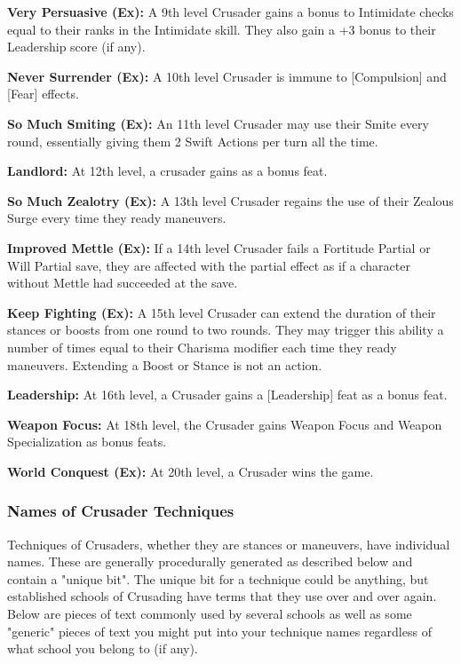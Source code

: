\textbf{Very Persuasive (Ex):} A 9th level Crusader gains a bonus to Intimidate checks equal to their ranks in the Intimidate skill. They also gain a +3 bonus to their Leadership score (if any).

\textbf{Never Surrender (Ex):} A 10th level Crusader is immune to [Compulsion] and [Fear] effects.

\textbf{So Much Smiting (Ex):} An 11th level Crusader may use their Smite every round, essentially giving them 2 Swift Actions per turn all the time.

\textbf{Landlord:} At 12th level, a crusader gains  as a bonus feat.

\textbf{So Much Zealotry (Ex):} A 13th level Crusader regains the use of their Zealous Surge every time they ready maneuvers.

\textbf{Improved Mettle (Ex):} If a 14th level Crusader fails a Fortitude Partial or Will Partial save, they are affected with the partial effect as if a character without Mettle had succeeded at the save.

\textbf{Keep Fighting (Ex):} A 15th level Crusader can extend the duration of their stances or boosts from one round to two rounds. They may trigger this ability a number of times equal to their Charisma modifier each time they ready maneuvers. Extending a Boost or Stance is not an action.

\textbf{Leadership:} At 16th level, a Crusader gains a [Leadership] feat as a bonus feat.

\textbf{Weapon Focus:} At 18th level, the Crusader gains Weapon Focus and Weapon Specialization as bonus feats.

\textbf{World Conquest (Ex):} At 20th level, a Crusader wins the game.

\subsubsection{Names of Crusader Techniques}

Techniques of Crusaders, whether they are stances or maneuvers, have individual names. These are generally procedurally generated as described below and contain a "unique bit". The unique bit for a technique could be anything, but established schools of Crusading have terms that they use over and over again. Below are pieces of text commonly used by several schools as well as some "generic" pieces of text you might put into your technique names regardless of what school you belong to (if any).

